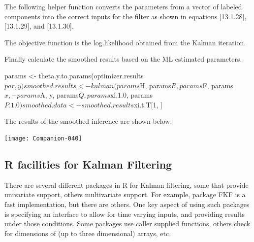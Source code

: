 \documentclass[a4paper]{article}
\begin{document}
The following helper function converts the parameters from a vector of labeled
components into the correct inputs for the filter as shown in equations [13.1.28], [13.1.29], and [13.1.30].
\begin{Schunk}
\end{Schunk}
The objective function is the log.likelihood obtained from the Kalman iteration.
\begin{Schunk}
\end{Schunk}
Finally calculate the smoothed results based on the ML estimated parameters.
\begin{Schunk}
\begin{Sinput}
 params <- theta.y.to.params(optimizer.results$par, y)
 smoothed.results <- kalman(params$H, params$R, params$F, params$x, 
+     params$A, y, params$Q, params$xi.1.0, params$P.1.0)
 smoothed.data <- smoothed.results$xi.t.T[1, ]
\end{Sinput}
\end{Schunk}
The results of the smoothed inference are shown below.
\begin{center}
\texttt{[image: Companion-040]}
\end{center}
\subsection{R facilities for Kalman Filtering}
There are several different packages in R for Kalman filtering, some that provide univariate support,
others multivariate support.  For example, package FKF is a fast implementation, but there are others. One key
aspect of using such packages is specifying an interface to allow for time varying inputs, and providing results
under those conditions.  Some packages use caller supplied functions, others check for dimensions of (up to three
dimensional) arrays, etc.
\end{document}
